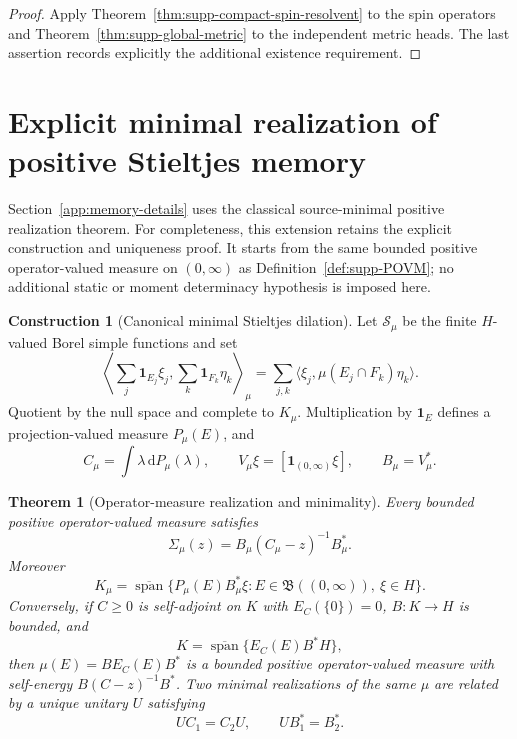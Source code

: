 \documentclass[11pt]{article}
\newtheorem{theorem}{Theorem}[section]
\theoremstyle{definition}
\newtheorem{construction}[construction]{Construction}
\theoremstyle{remark}
\theoremstyle{definition}
\theoremstyle{remark}
\newcommand{\one}{\mathbf 1}
\newcommand{\dd}{\mathrm d}
\newcommand{\Span}{\operatorname{span}}
\begin{document}
\begin{proof}
Apply Theorem~\ref{thm:supp-compact-spin-resolvent} to the spin operators and
Theorem~\ref{thm:supp-global-metric} to the independent metric heads.
The last assertion records explicitly the additional existence requirement.
\end{proof}

\section{Explicit minimal realization of positive Stieltjes memory}
\label{app:positive-dilation}

Section~\ref{app:memory-details} uses the classical source-minimal positive
realization theorem.  For completeness, this extension retains the explicit
construction and uniqueness proof.  It starts from the same bounded positive
operator-valued measure on $(0,\infty)$ as Definition~\ref{def:supp-POVM};
no additional static or moment determinacy hypothesis is imposed here.

\begin{construction}[Canonical minimal Stieltjes dilation]
\label{con:supp-Naimark-tail}
Let $\mathscr S_\mu$ be the finite $H$-valued Borel simple functions and set
\[
 \left\langle
 \sum_j\one_{E_j}\xi_j,
 \sum_k\one_{F_k}\eta_k
 \right\rangle_\mu
 =
 \sum_{j,k}
 \langle\xi_j,\mu(E_j\cap F_k)\eta_k\rangle.
\]
Quotient by the null space and complete to $K_\mu$.  Multiplication by
$\one_E$ defines a projection-valued measure $P_\mu(E)$, and
\[
 C_\mu=\int\lambda\,\dd P_\mu(\lambda),
 \qquad
 V_\mu\xi=[\one_{(0,\infty)}\xi],
 \qquad
 B_\mu=V_\mu^*.
\]
\end{construction}

\begin{theorem}[Operator-measure realization and minimality]
\label{thm:supp-Naimark-realization}
Every bounded positive operator-valued measure satisfies
\begin{equation}
 {
 \Sigma_\mu(z)
 =B_\mu(C_\mu-z)^{-1}B_\mu^*.}
 \label{eq:extension-Naimark-realization}
\end{equation}
Moreover
\begin{equation}
 {
 K_\mu
 =\overline{\Span}\{
 P_\mu(E)B_\mu^*\xi:
 E\in\mathfrak B((0,\infty)),\ \xi\in H\}.}
 \label{eq:supp-Naimark-minimal}
\end{equation}
Conversely, if $C\ge0$ is self-adjoint on $K$ with $E_C(\{0\})=0$,
$B:K\to H$ is bounded, and
\[
 K=\overline{\Span}\{E_C(E)B^*H\},
\]
then $\mu(E)=BE_C(E)B^*$ is a bounded positive operator-valued measure with
self-energy $B(C-z)^{-1}B^*$.  Two minimal realizations of the same
$\mu$ are related by a unique unitary $U$ satisfying
\begin{equation}
 {UC_1=C_2U,\qquad UB_1^*=B_2^*.}
 \label{eq:supp-Naimark-unitary}
\end{equation}
\end{theorem}
\end{document}
